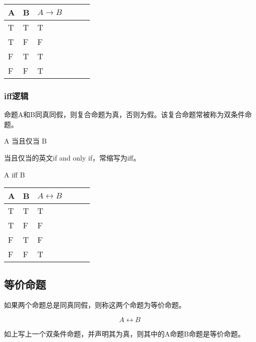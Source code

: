 \documentclass[12pt,oneside]{book}
\begin{document}
\begin{table}[H]
\begin{tabular}{@{}llllll@{}}
\toprule
{A} & {B}  & {$A \to B$} \\ \midrule

{T}          & {T}       & {T}   \\
{T}          & {F}       & {F}   \\
{F}          & {T}        & {T}   \\
{F}          & {F}       & {T}   \\ \bottomrule
\end{tabular}
\end{table}



\subsubsection{iff逻辑}
命题A和B同真同假，则复合命题为真，否则为假。该复合命题常被称为双条件命题。

\begin{framed}
A 当且仅当 B
\end{framed}

当且仅当的英文if and only if，常缩写为iff。
\begin{framed}
A iff B
\end{framed}

\begin{table}[H]
\begin{tabular}{@{}llllll@{}}
\toprule
{A} & {B}  & {$A \leftrightarrow B$} \\ \midrule
{T}          & {T}       & {T}   \\
{T}          & {F}       & {F}   \\
{F}          & {T}        & {F}   \\
{F}          & {F}       & {T}   \\ \bottomrule
\end{tabular}
\end{table}

\subsection{等价命题}
如果两个命题总是同真同假，则称这两个命题为等价命题。

\begin{equation*}
A \leftrightarrow B
\end{equation*}

如上写上一个双条件命题，并声明其为真，则其中的A命题B命题是等价命题。
\end{document}
